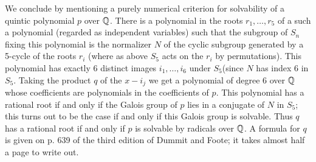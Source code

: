 \documentclass[10pt]{article}
\begin{document}
We conclude by mentioning a purely numerical criterion for solvability
of a quintic polynomial $p$ over $\Bbb Q$. There is a polynomial in the
roots $r_1,\ldots,r_5$ of a such a polynomial (regarded as independent
variables) such that the subgroup of $S_n$ fixing this polynomial is the
normalizer $N$ of the cyclic subgroup generated by a 5-cycle of the
roots $r_i$ (where as above $S_5$ acts on the $r_i$ by permutations).
This polynomial has exactly 6 distinct images $i_1,\ldots,i_6$ under
$S_5$(since $N$ has index 6 in $S_5$. Taking the product $q$ of the
$x-i_j$ we get a polynomial of degree 6 over $\Bbb Q$ whose coefficients
are polynomials in the coefficients of $p$. This polynomial has a
rational root if and only if the Galois group of $p$ lies in a conjugate
of $N$ in $S_5$; this turns out to be the case if and only if this
Galois group is solvable. Thus $q$ has a rational root if and only if
$p$ is solvable by radicals over $\Bbb Q$. A formula for $q$ is given on
p. 639 of the third edition of Dummit and Foote; it takes almost half a
page to write out.
\end{document}
